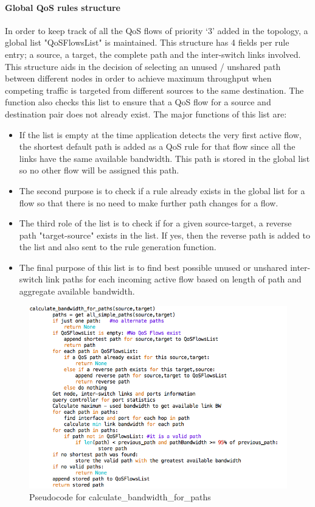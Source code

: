 \documentclass[paper=a4, fontsize=12pt]{scrartcl}	%
\numberwithin{equation}{section}		%
\numberwithin{figure}{section}			%
\numberwithin{table}{section}				%
\begin{document}
\paragraph{Global QoS rules structure}
In order to keep track of all the QoS flows of priority `3' added in the topology, a global list "QoSFlowsList" is maintained. This structure has 4 fields per rule entry; a source, a target, the complete path and the inter-switch links involved. This structure aids in the decision of selecting an unused / unshared path between different nodes in order to achieve maximum throughput when competing traffic is targeted from different sources to the same destination. The function also checks this list to ensure that a QoS flow for a source and destination pair does not already exist. The major functions of this list are:
\begin{itemize}
\item If the list is empty at the time application detects the very first active flow, the shortest default path is added as a QoS rule for that flow since all the links have the same available bandwidth. This path is stored in the global list so no other flow will be assigned this path.
\item The second purpose is to check if a rule already exists in the global list for a flow so that there is no need to make further path changes for a flow.
\item The third role of the list is to check if for a given source-target, a reverse path "target-source" exists in the list. If yes, then the reverse path is added to the list and also sent to the rule generation function.
\item The final purpose of this list is to find best possible unused or unshared inter-switch link paths for each incoming active flow based on length of path and aggregate available bandwidth.
\end{itemize}
\begin{figure}[H]
\begin{center}
\includegraphics[scale=0.55]{pseudo.png}   
\end{center}
 \caption{Pseudocode for calculate\_bandwidth\_for\_paths}
 \label{pseudo}
\end{figure}
\end{document}
